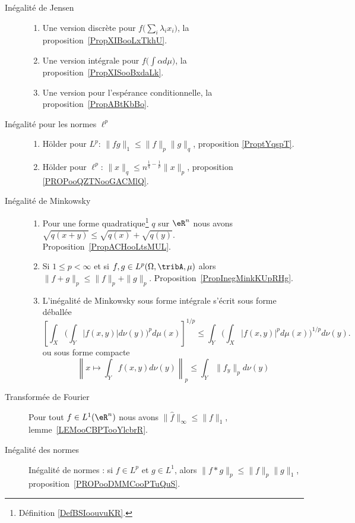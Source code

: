 \begin{description}
    \item[Inégalité de Jensen]
        \begin{enumerate}
            \item
                Une version discrète pour \( f\big( \sum_i\lambda_ix_i \big)\), la proposition~\ref{PropXIBooLxTkhU}.
            \item
                Une version intégrale pour \( f\big( \int \alpha d\mu \big)\), la proposition~\ref{PropXISooBxdaLk}.
            \item
                Une version pour l'espérance conditionnelle, la proposition~\ref{PropABtKbBo}.
        \end{enumerate}
    \item[Inégalité pour les normes $ \ell^p$]
        \begin{enumerate}
            \item
                Hölder pour \( L^p\): \( \| fg \|_1\leq \| f \|_p\| g \|_q\), proposition \ref{ProptYqspT}.
            \item
                Hölder pour \( \ell^p\): \( \| x \|_q\leq n^{\frac{1}{ q }-\frac{1}{ p }}\| x \|_p\), proposition \ref{PROPooQZTNooGACMlQ}.
        \end{enumerate}
    \item[Inégalité de Minkowsky]
        \begin{enumerate}
            \item
                Pour une forme quadratique\footnote{Définition \ref{DefBSIoouvuKR}.} \( q\) sur \( \eR^n\) nous avons $\sqrt{q(x+y)}\leq\sqrt{q(x)}+\sqrt{q(y)}$. Proposition~\ref{PropACHooLtsMUL}.
            \item
                Si \( 1\leq p<\infty\) et si \( f,g\in L^p(\Omega,\tribA,\mu)\) alors \(  \| f+g \|_p\leq \| f \|_p+\| g \|_p\). Proposition~\ref{PropInegMinkKUpRHg}.
            \item
                L'inégalité de Minkowsky sous forme intégrale s'écrit sous forme déballée
                \begin{equation*}
                    \left[ \int_X\Big( \int_Y| f(x,y) |d\nu(y) \Big)^pd\mu(x) \right]^{1/p}\leq \int_Y\Big( \int_X| f(x,y) |^pd\mu(x) \Big)^{1/p}d\nu(y).
                \end{equation*}
                ou sous forme compacte
                \begin{equation*}
                    \left\|   x\mapsto\int_Y f(x,y)d\nu(y)   \right\|_p\leq \int_Y  \| f_y \|_pd\nu(y)
                \end{equation*}
        \end{enumerate}
    \item[Transformée de Fourier]
                Pour tout \( f\in L^1(\eR^n)\) nous avons \( \| \hat f \|_{\infty}\leq \| f \|_1\), lemme~\ref{LEMooCBPTooYlcbrR}.
    \item[Inégalité des normes]
        Inégalité de normes : si \( f\in L^p\) et \( g\in L^1\), alors \( \| f*g \|_p\leq \| f \|_p\| g \|_1\), proposition~\ref{PROPooDMMCooPTuQuS}.

\end{description}



